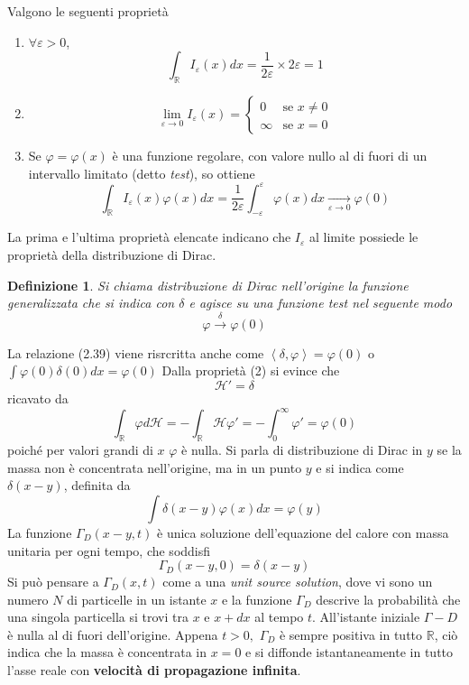 \documentclass[a4paper,12pt, draft]{article}
\theoremstyle{break}
\newtheorem{definition}{Definizione}[section]
\let\epsilon\varepsilon
\let\phi\varphi
\numberwithin{equation}{section}
\begin{document}
Valgono le seguenti proprietà
\begin{enumerate}
  \item \(\forall \epsilon > 0\), 
  \[
  \int_{\mathbb{R}} I_{\epsilon} (x) dx = \frac{1}{2\epsilon} \times 2\epsilon = 1  
  \]
  \item \[
    \lim_{\epsilon \to 0} I_{\epsilon}(x) = \begin{cases}
      0  &\mbox{se } x \not = 0 \\
      \infty & \mbox{se } x = 0
    \end{cases}
  \]
  \item Se \(\phi = \phi (x)\) è una funzione regolare, con valore nullo al di fuori di un intervallo limitato (detto \emph{test}), so ottiene 
  \[
  \int_{\mathbb{R}} I_{\epsilon}(x)\phi(x)dx = \frac{1}{2\epsilon}\int_{-\epsilon}^{\epsilon} \phi(x) dx \underset{\epsilon \longrightarrow 0}{\longrightarrow}   \phi (0)
  \]
\end{enumerate}
La prima e l'ultima proprietà elencate indicano che \(I_{\epsilon}\) al limite possiede le proprietà della distribuzione di Dirac.
\begin{definition}
  Si chiama distribuzione di Dirac nell'origine la funzione generalizzata che si indica con \(\delta\) e agisce su una funzione \emph{test} nel seguente modo 
  \begin{equation}
    \phi \overset{\delta}{\longrightarrow} \phi (0) 
  \end{equation}
\end{definition}
La relazione (2.39) viene risrcritta anche come \(\left\langle \delta, \phi \right\rangle = \phi (0) \) o \(\int \phi(0)\delta(0)dx = \phi(0)\)
Dalla proprietà (2) si evince che
\[
\mathcal{H}' = \delta
\]
ricavato da 
\begin{equation}
  \int_{\mathbb{R}} \phi d\mathcal{H} = -\int_{\mathbb{R}}\mathcal{H}\phi' = -\int_{0}^{\infty} \phi' = \phi(0)
\end{equation}
poiché per valori grandi di \(x\) \(\phi\) è nulla. Si parla di distribuzione di Dirac in \(y\) se la massa non è concentrata nell'origine, ma in un punto \(y\) e si indica come \(\delta(x-y)\), definita da
\begin{equation}
  \int \delta (x -y) \phi(x) dx = \phi (y)
\end{equation}
La funzione \(\Gamma_D (x-y, t)\) è unica soluzione dell'equazione del calore con massa unitaria per ogni tempo, che soddisfi
\[
  \Gamma_D (x-y, 0) = \delta(x-y)  
\]
Si può pensare a \(\Gamma_D(x,t)\) come a una \emph{unit source solution}, dove vi sono un numero \(N\) di particelle in un istante \(x\) e la funzione \(\Gamma_D\) descrive la probabilità che una singola particella si trovi tra \(x \mbox{ e } x+dx\) al tempo \(t\). All'istante iniziale \(\Gamma-D\) è nulla al di fuori dell'origine. Appena \(t > 0,\) \(\Gamma_D\) è sempre positiva in tutto \(\mathbb{R}\), ciò indica che la massa è concentrata in \(x = 0\) e si diffonde istantaneamente in tutto l'asse reale con \textbf{velocità di propagazione infinita}.
\end{document}
